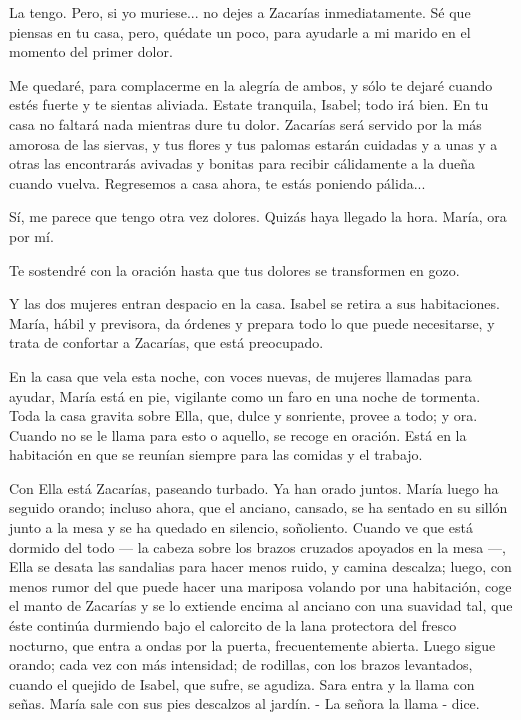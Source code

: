 \documentclass[12pt]{book} %
\begin{document}
La tengo. Pero, si yo muriese... no dejes a Zacarías inmediatamente. Sé que piensas en tu casa, pero, quédate un poco, para ayudarle a mi marido en el momento del primer dolor. 

Me quedaré, para complacerme en la alegría de ambos, y sólo te dejaré cuando estés fuerte y te sientas aliviada. Estate tranquila, Isabel; todo irá bien. En tu casa no faltará nada mientras dure tu dolor. Zacarías será servido por la más amorosa de las siervas, y tus flores y tus palomas estarán cuidadas y a unas y a otras las encontrarás avivadas y bonitas para recibir cálidamente a la dueña cuando vuelva. Regresemos a casa ahora, te estás poniendo pálida... 

Sí, me parece que tengo otra vez dolores. Quizás haya llegado la hora. María, ora por mí. 

Te sostendré con la oración hasta que tus dolores se transformen en gozo. 

Y las dos mujeres entran despacio en la casa. Isabel se retira a sus habitaciones. María, hábil y previsora, da órdenes y prepara todo lo que puede necesitarse, y trata de confortar a Zacarías, que está preocupado. 

En la casa que vela esta noche, con voces nuevas, de mujeres llamadas para ayudar, María está en pie, vigilante como un faro en una noche de tormenta. Toda la casa gravita sobre Ella, que, dulce y sonriente, provee a todo; y ora. Cuando no se le llama para esto o aquello, se recoge en oración. Está en la habitación en que se reunían siempre para las comidas y el trabajo. 

Con Ella está Zacarías, paseando turbado. Ya han orado juntos. María luego ha seguido orando; incluso ahora, que el anciano, cansado, se ha sentado en su sillón junto a la mesa y se ha quedado en silencio, soñoliento. Cuando ve que está dormido del todo — la cabeza sobre los brazos cruzados apoyados en la mesa —, Ella se desata las sandalias para hacer menos ruido, y camina descalza; luego, con menos rumor del que puede hacer una mariposa volando por una habitación, coge el manto de Zacarías y se lo extiende encima al anciano con una suavidad tal, que éste continúa durmiendo bajo el calorcito de la lana protectora del fresco nocturno, que entra a ondas por la puerta, frecuentemente abierta. Luego sigue orando; cada vez con más intensidad; de rodillas, con los brazos levantados, cuando el quejido de Isabel, que sufre, se agudiza. Sara entra y la llama con señas. María sale con sus pies descalzos al jardín. - La señora la llama - dice. 
\end{document}
